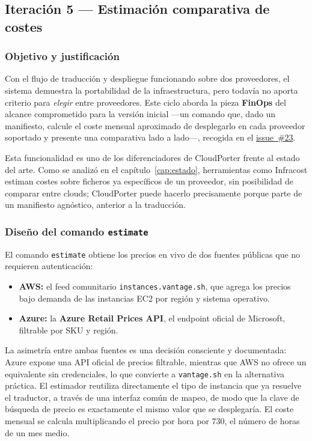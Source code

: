 \subsection{Iteración 5 — Estimación comparativa de costes}
\label{sec:iter5}

\subsubsection{Objetivo y justificación}

Con el flujo de traducción y despliegue funcionando sobre dos proveedores, el sistema demuestra
la portabilidad de la infraestructura, pero todavía no aporta criterio para \textit{elegir} entre
proveedores. Este ciclo aborda la pieza \textbf{FinOps} del alcance comprometido para la versión
inicial —un comando que, dado un manifiesto, calcule el coste mensual aproximado de desplegarlo
en cada proveedor soportado y presente una comparativa lado a lado—, recogida en el
\href{https://github.com/lucpez/cloudporter/issues/23}{issue~\#23}.

Esta funcionalidad es uno de los diferenciadores de CloudPorter frente al estado del arte. Como
se analizó en el capítulo~\ref{cap:estado}, herramientas como Infracost estiman costes sobre
ficheros ya específicos de un proveedor, sin posibilidad de comparar entre clouds; CloudPorter
puede hacerlo precisamente porque parte de un manifiesto agnóstico, anterior a la traducción.

\subsubsection{Diseño del comando \texttt{estimate}}

El comando \texttt{estimate} obtiene los precios en vivo de dos fuentes públicas que no
requieren autenticación:

\begin{itemize}
    \item \textbf{AWS:} el feed comunitario \texttt{instances.vantage.sh}, que agrega los
    precios bajo demanda de las instancias EC2 por región y sistema operativo.
    \item \textbf{Azure:} la \textbf{Azure Retail Prices API}, el endpoint oficial de Microsoft,
    filtrable por SKU y región.
\end{itemize}

La asimetría entre ambas fuentes es una decisión consciente y documentada: Azure expone una API
oficial de precios filtrable, mientras que AWS no ofrece un equivalente sin credenciales, lo que
convierte a \texttt{vantage.sh} en la alternativa práctica. El estimador reutiliza directamente
el tipo de instancia que ya resuelve el traductor, a través de una interfaz común de mapeo, de
modo que la clave de búsqueda de precio es exactamente el mismo valor que se desplegaría. El
coste mensual se calcula multiplicando el precio por hora por 730, el número de horas de un mes
medio.

